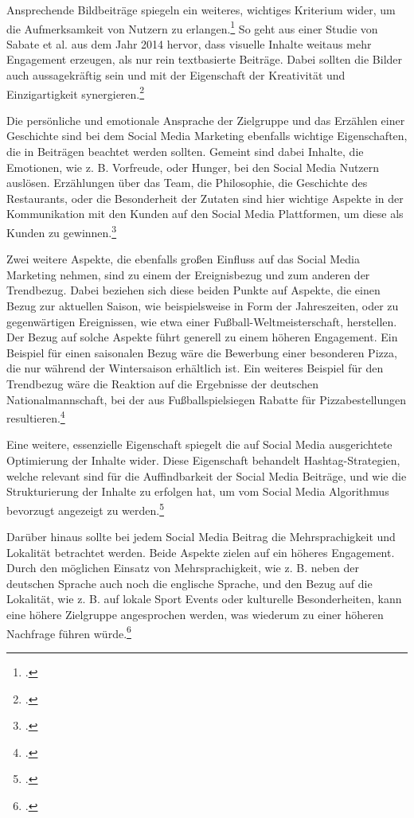 Ansprechende Bildbeiträge spiegeln ein weiteres, wichtiges Kriterium wider, um die Aufmerksamkeit von Nutzern zu erlangen.\footcite{davidson_social_media}
So geht aus einer Studie von Sabate et al. aus dem Jahr 2014 hervor, dass visuelle Inhalte weitaus mehr Engagement erzeugen, als nur rein textbasierte Beiträge.
Dabei sollten die Bilder auch aussagekräftig sein und mit der Eigenschaft der Kreativität und Einzigartigkeit synergieren.\footcite{sabate_factors}

Die persönliche und emotionale Ansprache der Zielgruppe und das Erzählen einer Geschichte sind bei dem Social Media Marketing ebenfalls wichtige Eigenschaften, die in Beiträgen beachtet werden sollten.
Gemeint sind dabei Inhalte, die Emotionen, wie z. B. Vorfreude, oder Hunger, bei den Social Media Nutzern auslösen.
Erzählungen über das Team, die Philosophie, die Geschichte des Restaurants, oder die Besonderheit der Zutaten sind hier wichtige Aspekte in der Kommunikation mit den Kunden auf den Social Media Plattformen, um diese als Kunden zu gewinnen.\footcite{book}

Zwei weitere Aspekte, die ebenfalls großen Einfluss auf das Social Media Marketing nehmen, sind zu einem der Ereignisbezug und zum anderen der Trendbezug.
Dabei beziehen sich diese beiden Punkte auf Aspekte, die einen Bezug zur aktuellen Saison, wie beispielsweise in Form der Jahreszeiten, oder zu gegenwärtigen Ereignissen, wie etwa einer Fußball-Weltmeisterschaft, herstellen.
Der Bezug auf solche Aspekte führt generell zu einem höheren Engagement.
Ein Beispiel für einen saisonalen Bezug wäre die Bewerbung einer besonderen Pizza, die nur während der Wintersaison erhältlich ist.
Ein weiteres Beispiel für den Trendbezug wäre die Reaktion auf die Ergebnisse der deutschen Nationalmannschaft, bei der aus Fußballspielsiegen Rabatte für Pizzabestellungen resultieren.\footcite{inbook}

Eine weitere, essenzielle Eigenschaft spiegelt die auf Social Media ausgerichtete Optimierung der Inhalte wider.
Diese Eigenschaft behandelt Hashtag-Strategien, welche relevant sind für die Auffindbarkeit der Social Media Beiträge, und wie die Strukturierung der Inhalte zu erfolgen hat, um vom Social Media Algorithmus bevorzugt angezeigt zu werden.\footcite{social_media_marketing}

Darüber hinaus sollte bei jedem Social Media Beitrag die Mehrsprachigkeit und Lokalität betrachtet werden.
Beide Aspekte zielen auf ein höheres Engagement.
Durch den möglichen Einsatz von Mehrsprachigkeit, wie z. B. neben der deutschen Sprache auch noch die englische Sprache, und den Bezug auf die Lokalität, wie z. B. auf lokale Sport Events oder kulturelle Besonderheiten, kann eine höhere Zielgruppe angesprochen werden, was wiederum zu einer höheren Nachfrage führen würde.\footcite{global_marketing_advertising}


